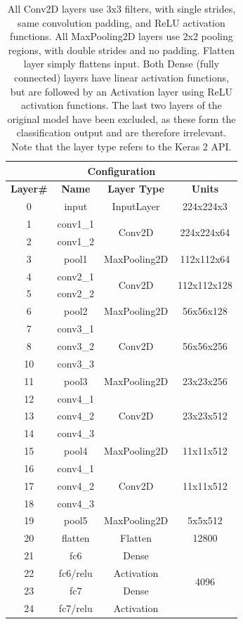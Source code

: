 \begin{table}[!h]
\begin{center}
\begin{tabular}{|c|c|c|c|}
\hline
\multicolumn{4}{|c|}{Configuration} \\ \hline
\textbf{Layer#} & \textbf{Name} & \textbf{Layer Type} & \textbf{Units} \\ \hline
0 & input & InputLayer & 224x224x3  \\ \hline
1 & conv1\_1 & \multirow{2}{*}{Conv2D} & \multirow{2}{*}{224x224x64} \\ \cline{1-2}
2 & conv1\_2 & & \\ \hline
3 & pool1 & MaxPooling2D & 112x112x64 \\ \hline
4 & conv2\_1 & \multirow{2}{*}{Conv2D} & \multirow{2}{*}{112x112x128} \\ \cline{1-2}
5 & conv2\_2 & & \\ \hline
6 & pool2 & MaxPooling2D & 56x56x128 \\ \hline
7 & conv3\_1 & \multirow{3}{*}{Conv2D} & \multirow{3}{*}{56x56x256} \\ \cline{1-2}
8 & conv3\_2 & & \\ \cline{1-2}
10 & conv3\_3 & & \\ \hline
11 & pool3 & MaxPooling2D & 23x23x256 \\ \hline
12 & conv4\_1 & \multirow{3}{*}{Conv2D} & \multirow{3}{*}{23x23x512} \\ \cline{1-2}
13 & conv4\_2 & & \\ \cline{1-2}
14 & conv4\_3 & & \\ \hline
15 & pool4 & MaxPooling2D & 11x11x512 \\ \hline
16 & conv4\_1 & \multirow{3}{*}{Conv2D} & \multirow{3}{*}{11x11x512} \\ \cline{1-2}
17 & conv4\_2 & & \\ \cline{1-2}
18 & conv4\_3 & & \\ \hline
19 & pool5 & MaxPooling2D & 5x5x512 \\ \hline
20 & flatten & Flatten & 12800 \\ \hline
21 & fc6 & Dense & \multirow{4}{*}{4096} \\ \cline{1-3}
22 & fc6/relu & Activation & \\ \cline{1-3}
23 & fc7 & Dense & \\ \cline{1-3}
24 & fc7/relu & Activation & \\ \hline
\end{tabular}
\end{center}
\caption[Pretraining network architecture]{All Conv2D layers use 3x3 filters, with single strides, same convolution padding, and ReLU activation functions. All MaxPooling2D layers use 2x2 pooling regions, with double strides and no padding. Flatten layer simply flattens input. Both Dense (fully connected) layers have linear activation functions, but are followed by an Activation layer using ReLU activation functions. The last two layers of the original model have been excluded, as these form the classification output and are therefore irrelevant. Note that the layer type refers to the Keras 2 API.}
\label{tab:vggface-arch}
\end{table}

